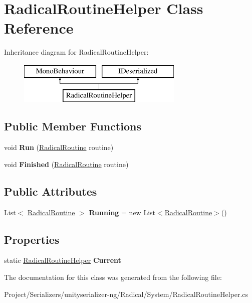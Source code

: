 \hypertarget{class_radical_routine_helper}{}\section{Radical\+Routine\+Helper Class Reference}
\label{class_radical_routine_helper}
Inheritance diagram for Radical\+Routine\+Helper\+:\begin{figure}[H]
\begin{center}
\leavevmode
\includegraphics[height=2.000000cm]{class_radical_routine_helper}
\end{center}
\end{figure}
\subsection*{Public Member Functions}
\begin{DoxyCompactItemize}
\item 
\mbox{\label{class_radical_routine_helper_ae6a4aec7bac59c73975ead99b89c64fe}} 
void {\bfseries Run} (\hyperlink{class_radical_routine}{Radical\+Routine} routine)
\item 
\mbox{\label{class_radical_routine_helper_aaacd9e96eac0a194c8e06981ad7fe535}} 
void {\bfseries Finished} (\hyperlink{class_radical_routine}{Radical\+Routine} routine)
\end{DoxyCompactItemize}
\subsection*{Public Attributes}
\begin{DoxyCompactItemize}
\item 
\mbox{\label{class_radical_routine_helper_a42746cd71d9b42bc9096a798a9a06764}} 
List$<$ \hyperlink{class_radical_routine}{Radical\+Routine} $>$ {\bfseries Running} = new List$<$\hyperlink{class_radical_routine}{Radical\+Routine}$>$()
\end{DoxyCompactItemize}
\subsection*{Properties}
\begin{DoxyCompactItemize}
\item 
\mbox{\label{class_radical_routine_helper_a7f25af81769f7c98c540ea3a46e7f555}} 
static \hyperlink{class_radical_routine_helper}{Radical\+Routine\+Helper} {\bfseries Current}
\end{DoxyCompactItemize}


The documentation for this class was generated from the following file\+:\begin{DoxyCompactItemize}
\item 
Project/\+Serializers/unityserializer-\/ng/\+Radical/\+System/Radical\+Routine\+Helper.\+cs\end{DoxyCompactItemize}

